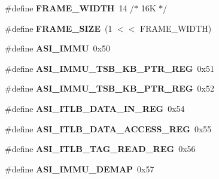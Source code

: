 \begin{DoxyCompactItemize}
\item 
\mbox{\label{group__RTEMSBSPsSPARC64mm_gaf193f69a079134ae165cc495b9b62d70}} 
\#define {\bfseries F\+R\+A\+M\+E\+\_\+\+W\+I\+D\+TH}~14	/$\ast$ 16\+K $\ast$/
\item 
\mbox{\label{group__RTEMSBSPsSPARC64mm_gaf9b1b2ba12857a4bf11289dac8c5462d}} 
\#define {\bfseries F\+R\+A\+M\+E\+\_\+\+S\+I\+ZE}~(1 $<$$<$ F\+R\+A\+M\+E\+\_\+\+W\+I\+D\+TH)
\item 
\mbox{\label{group__RTEMSBSPsSPARC64mm_gaadc355af58a03d0196cd5f2aefcfdbef}} 
\#define {\bfseries A\+S\+I\+\_\+\+I\+M\+MU}~0x50
\item 
\mbox{\label{group__RTEMSBSPsSPARC64mm_gae2b68b53968be06fc78a3e688f315570}} 
\#define {\bfseries A\+S\+I\+\_\+\+I\+M\+M\+U\+\_\+\+T\+S\+B\+\_\+K\+B\+\_\+\+P\+T\+R\+\_\+\+R\+EG}~0x51
\item 
\mbox{\label{group__RTEMSBSPsSPARC64mm_ga1f3158608d7a68f8524e08fcc0934344}} 
\#define {\bfseries A\+S\+I\+\_\+\+I\+M\+M\+U\+\_\+\+T\+S\+B\+\_\+K\+B\+\_\+\+P\+T\+R\+\_\+\+R\+EG}~0x52
\item 
\mbox{\label{group__RTEMSBSPsSPARC64mm_ga5136c27c3d3f949184dcc44987e5b095}} 
\#define {\bfseries A\+S\+I\+\_\+\+I\+T\+L\+B\+\_\+\+D\+A\+T\+A\+\_\+\+I\+N\+\_\+\+R\+EG}~0x54
\item 
\mbox{\label{group__RTEMSBSPsSPARC64mm_ga021afd892f66fb9acca7a59bacff9cd2}} 
\#define {\bfseries A\+S\+I\+\_\+\+I\+T\+L\+B\+\_\+\+D\+A\+T\+A\+\_\+\+A\+C\+C\+E\+S\+S\+\_\+\+R\+EG}~0x55
\item 
\mbox{\label{group__RTEMSBSPsSPARC64mm_ga3fefb916514489a9bc2ef9ea3ad5f673}} 
\#define {\bfseries A\+S\+I\+\_\+\+I\+T\+L\+B\+\_\+\+T\+A\+G\+\_\+\+R\+E\+A\+D\+\_\+\+R\+EG}~0x56
\item 
\mbox{\label{group__RTEMSBSPsSPARC64mm_ga08579f375bcf354788446cb7a198b6cd}} 
\#define {\bfseries A\+S\+I\+\_\+\+I\+M\+M\+U\+\_\+\+D\+E\+M\+AP}~0x57
\item 
$$
\end{DoxyCompactItemize}

